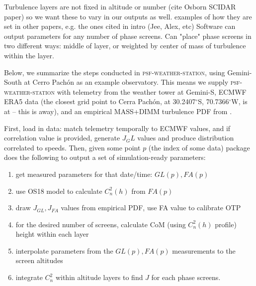 \documentclass[twocolumn]{aastex631}
\newcommand{\psfws}{\textsc{psf-weather-station}\xspace}
\newcommand{\osborn}{OS18\xspace}
\begin{document}
Turbulence layers are not fixed in altitude or number (cite Osborn SCIDAR paper) so we want these to vary in our outputs as well.
examples of how they are set in other papers, e.g. the ones cited in intro (Jee, Alex, etc)
Software can output parameters for any number of phase screens.
Can "place" phase screens in two different ways: middle of layer, or weighted by center of mass of turbulence within the layer.

Below, we summarize the steps conducted in \psfws, using Gemini-South at Cerro Pachón as an example observatory. 
This means we supply \psfws with telemetry from the weather tower at Gemini-S, ECMWF ERA5 data (the closest grid point to Cerra Pachón, at 30.2407$^{\circ}$S, 70.7366$^{\circ}$W, is at  -- this is  away), and an empirical MASS+DIMM turbulence PDF from . 


First, load in data: match telemetry temporally to ECMWF values, and if correlation value is provided, generate $J_GL$ values and produce distribution correlated to speeds.
Then, given some point $p$ (the index of some data) package does the following to output a set of simulation-ready parameters:
\begin{enumerate}
\item get measured parameters for that date/time: $GL(p), FA(p)$
\item use \osborn model to calculate $C_n^2(h)$ from $FA(p)$
\item draw $J_{GL}, J_{FA}$ values from empirical PDF, use FA value to calibrate OTP
\item for the desired number of screens, calculate CoM (using $C_n^2(h)$ profile) height within each layer
\item interpolate parameters from the $GL(p), FA(p)$ measurements to the screen altitudes
\item integrate $C_n^2$ within altitude layers to find $J$ for each phase screens.
\end{enumerate}
\end{document}
